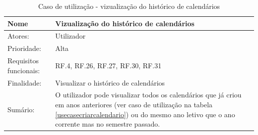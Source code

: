\documentclass[11pt, twoside]{report}
\begin{document}
	\begin{table}[H]
		\caption{Caso de utilização - vizualização do histórico de calendários}
		\begin{center}	
			\begin{tabularx}{\textwidth}{|l|X|}
				\hline
				\textbf{Nome }              & \textbf{Vizualização do histórico de calendários}                                                                                                                                                                                                                                                             \\
				\hline
				Atores:                     & Utilizador                                                                                                                                                                                                                                                                                                        \\
				\hline
				Prioridade:                 & Alta                                                                                                                                                                                                                                                                                                              \\
				\hline
				Requisitos funcionais:      & RF.4, RF.26, RF.27, RF.30, RF.31                                                                                                                                                                                                                                                                                  \\
				\hline
				Finalidade:                 & Visualizar o histórico de calendários                                                                                                                                                                                                                                                                           \\
				\hline
				Sumário:                   & O utilizador pode visualizar todos os calendários que já criou em anos anteriores (ver caso de utilização na tabela \ref{usecasecriarcalendario}) ou do mesmo ano letivo que o ano corrente mas no semestre passado.                                                                                          \\

\end{tabularx}
\end{center}
\end{table}
\end{document}
